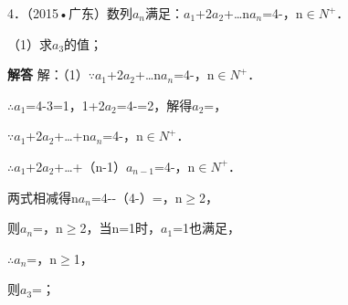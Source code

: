 4．（2015•广东）数列{\ensuremath{a_{n}}}满足：\ensuremath{a_{1}}+2\ensuremath{a_{2}}+\ldots{}n\ensuremath{a_{n}}=4-，n\ensuremath{\in}\ensuremath{N^{+}}．\par
（1）求\ensuremath{a_{3}}的值；\par
\QuestionSpace{3.5cm}
\ifshowanswers
\par\begingroup\color{solutioncolor}\noindent\textbf{解答}\quad
解：（1）\ensuremath{\because}\ensuremath{a_{1}}+2\ensuremath{a_{2}}+\ldots{}n\ensuremath{a_{n}}=4-，n\ensuremath{\in}\ensuremath{N^{+}}．\par
\ensuremath{\therefore}\ensuremath{a_{1}}=4-3=1，1+2\ensuremath{a_{2}}=4-=2，解得\ensuremath{a_{2}}=，\par
\ensuremath{\because}\ensuremath{a_{1}}+2\ensuremath{a_{2}}+\ldots{}+n\ensuremath{a_{n}}=4-，n\ensuremath{\in}\ensuremath{N^{+}}．\par
\ensuremath{\therefore}\ensuremath{a_{1}}+2\ensuremath{a_{2}}+\ldots{}+（n-1）\ensuremath{a_{n-1}}=4-，n\ensuremath{\in}\ensuremath{N^{+}}．\par
两式相减得n\ensuremath{a_{n}}=4--（4-）=，n\ensuremath{\ge}2，\par
则\ensuremath{a_{n}}=，n\ensuremath{\ge}2，当n=1时，\ensuremath{a_{1}}=1也满足，\par
\ensuremath{\therefore}\ensuremath{a_{n}}=，n\ensuremath{\ge}1，\par
则\ensuremath{a_{3}}=；\par
\par\endgroup\fi

